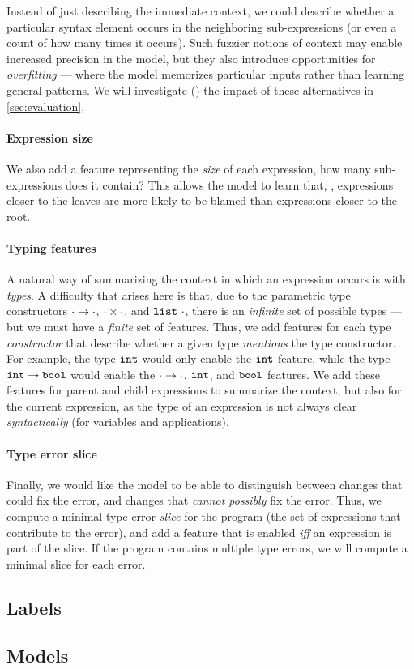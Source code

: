Instead of just describing the immediate context, we could describe
whether a particular syntax element occurs in the neighboring
sub-expressions (or even a count of how many times it occurs).
%
Such fuzzier notions of context may enable increased precision in the
model, but they also introduce opportunities for \emph{overfitting} ---
where the model memorizes particular inputs rather than learning general
patterns.
%
We will investigate () the impact of these alternatives
in \autoref{sec:evaluation}.

\paragraph{Expression size}
We also add a feature representing the \emph{size} of each expression,
\ie how many sub-expressions does it contain?
%
This allows the model to learn that, \eg, expressions closer to the
leaves are more likely to be blamed than expressions closer to the root.

\paragraph{Typing features}
A natural way of summarizing the context in which an expression occurs
is with \emph{types}.
%
A difficulty that arises here is that, due to the parametric type
constructors $\cdot \to \cdot$, $\cdot \times \cdot$, and
$\mathtt{list}\ \cdot$, there is an \emph{infinite} set of possible types ---
but we must have a \emph{finite} set of features.
%
Thus, we add features for each type \emph{constructor} that describe
whether a given type \emph{mentions} the type constructor.
%
For example, the type $\mathtt{int}$ would only enable the $\mathtt{int}$ feature,
while the type $\mathtt{int} \to \mathtt{bool}$ would enable the
$\cdot \to \cdot$, $\mathtt{int}$, and $\mathtt{bool}$ features.
%
We add these features for parent and child expressions to summarize the
context, but also for the current expression, as the type of an
expression is not always clear \emph{syntactically} (\eg for variables
and applications).

\paragraph{Type error slice}
Finally, we would like the model to be able to distinguish between
changes that could fix the error, and changes that
\emph{cannot possibly} fix the error.
%
Thus, we compute a minimal type error \emph{slice} for the program
(\ie the set of expressions that contribute to the error), and add a
feature that is enabled \emph{iff} an expression is part of the slice.
%
If the program contains multiple type errors, we will compute a minimal
slice for each error.

\subsection{Labels}
\label{sec:labels}

\subsection{Models}
\label{sec:models}





